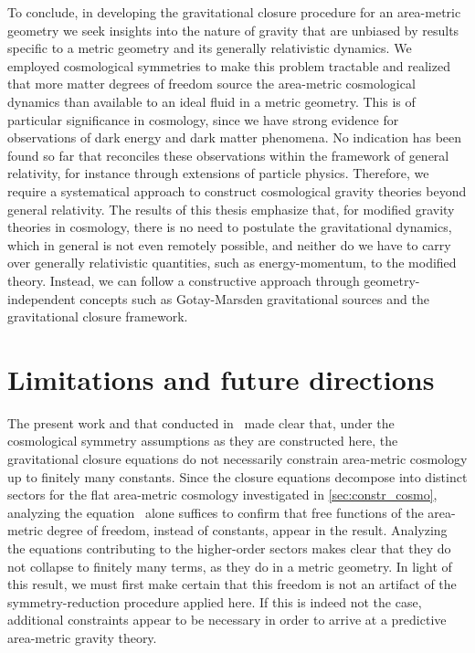 To conclude, in developing the gravitational closure procedure for an area-metric geometry we seek insights into the nature of gravity that are unbiased by results specific to a metric geometry and its generally relativistic dynamics. We employed cosmological symmetries to make this problem tractable and realized that more matter degrees of freedom source the area-metric cosmological dynamics than available to an ideal fluid in a metric geometry. This is of particular significance in cosmology, since we have strong evidence for observations of dark energy and dark matter phenomena. No indication has been found so far that reconciles these observations within the framework of general relativity, for instance through extensions of particle physics. Therefore, we require a systematical approach to construct cosmological gravity theories beyond general relativity. The results of this thesis emphasize that, for modified gravity theories in cosmology, there is no need to postulate the gravitational dynamics, which in general is not even remotely possible, and neither do we have to carry over generally relativistic quantities, such as energy-momentum, to the modified theory. Instead, we can follow a constructive approach through geometry-independent concepts such as Gotay-Marsden gravitational sources and the gravitational closure framework.


\section{Limitations and future directions}

The present work and that conducted in~\autocite{DuellPhd} made clear that, under the cosmological symmetry assumptions as they are constructed here, the gravitational closure equations do not necessarily constrain area-metric cosmology up to finitely many constants. Since the closure equations decompose into distinct sectors for the flat area-metric cosmology investigated in \autoref{sec:constr_cosmo}, analyzing the equation~ alone suffices to confirm that free functions of the area-metric degree of freedom, instead of constants, appear in the result. Analyzing the equations contributing to the higher-order sectors makes clear that they do not collapse to finitely many terms, as they do in a metric geometry. In light of this result, we must first make certain that this freedom is not an artifact of the symmetry-reduction procedure applied here. If this is indeed not the case, additional constraints appear to be necessary in order to arrive at a predictive area-metric gravity theory.


